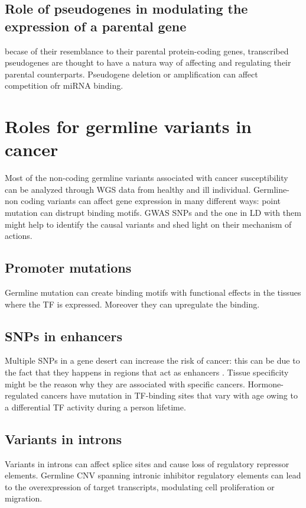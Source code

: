 	\subsection{Role of pseudogenes in modulating the expression of a parental gene}
	becase of their resemblance to their parental protein-coding genes, transcribed pseudogenes are thought to have a natura way of affecting and regulating their parental counterparts.
	Pseudogene deletion or amplification can affect competition ofr miRNA binding.

\section{Roles for germline variants in cancer}
Most of the non-coding germline variants associated with cancer susceptibility can be analyzed through WGS data from healthy and ill individual.
Germline-non coding variants can affect gene expression in many different ways: point mutation can distrupt binding motifs.
GWAS SNPs and the one in LD with them might help to identify the causal variants and shed light on their mechanism of actions.

	\subsection{Promoter mutations}
	Germline mutation can create binding motifs with functional effects in the tissues where the TF is expressed.
	Moreover they can upregulate the binding.

	\subsection{SNPs in enhancers}
	Multiple SNPs in a gene desert can increase the risk of cancer: this can be due to the fact that they happens in regions that act as enhancers .
	Tissue specificity might be the reason why they are associated with specific cancers.
	Hormone-regulated cancers have mutation in TF-binding sites that vary with age owing to a differential TF activity during a person lifetime.

	\subsection{Variants in introns}
	Variants in introns can affect splice sites and cause loss of regulatory repressor elements.
	Germline CNV spanning intronic inhibitor regulatory elements can lead to the overexpression of target transcripts, modulating cell proliferation or migration.

